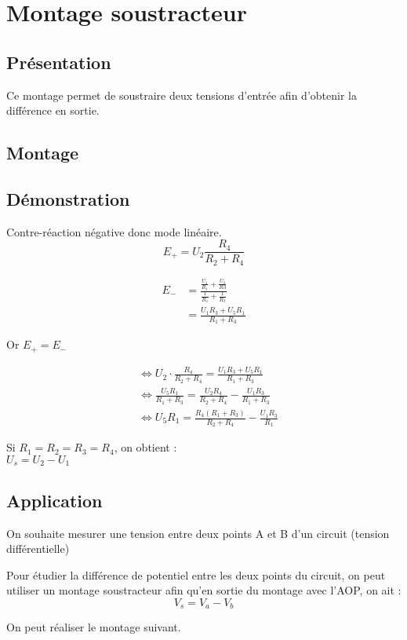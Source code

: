 

\chapter{Montage soustracteur}
\section{Présentation}
Ce montage permet de soustraire deux tensions d’entrée afin d’obtenir la différence en sortie.

\section{Montage}


\section{Démonstration}


Contre-réaction négative donc mode linéaire.\\


$$E_+=U_2\frac{R_4}{R_2+R_4}$$

\begin{align}
E_-&=\frac{\frac{U_1}{R_1}+\frac{U_5}{R3}}{\frac{1}{R_1}+\frac{1}{R_3}}\\
&=\frac{U_1R_3+U_5R_1}{R_1+R_3}
\end{align}

Or $E_+=E_-$

\begin{align}
&\Leftrightarrow U_2 \cdot \frac{R_4}{R_2+R_4} = \frac{U_1R_3+U_5R_1}{R_1+R_3} \\
&\Leftrightarrow  \frac{U_5R_1}{R_1+R_3} = \frac{U_2R_4}{R_2+R_4} -\frac{U_1R_3}{R_1+R_3} \\
&\Leftrightarrow  U_5R_1 = \frac{R_4(R_1+R_3)}{R_2+R_4} - \frac{U_1R_3}{R_1} 
\end{align}


Si $R_1=R_2=R_3=R_4$, on obtient : \\

$U_s=U_2-U_1$\\

\section{Application}

\begin{exemple}
On souhaite mesurer une tension entre deux points A et B d’un circuit (tension différentielle)
\end{exemple}


Pour étudier la différence de potentiel entre les deux points du circuit, on peut utiliser un montage soustracteur afin qu’en sortie du montage avec l’AOP, on ait : $$V_s=V_a-V_b$$

On peut réaliser le montage suivant.


